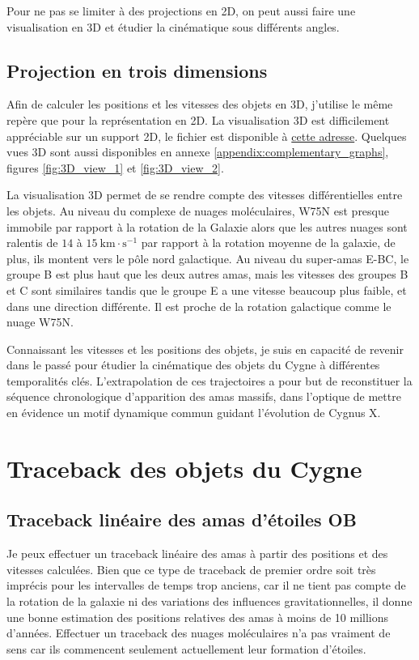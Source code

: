 \documentclass[a4paper, 11pt]{article}
\begin{document}
	Pour ne pas se limiter à des projections en 2D, on peut aussi faire une visualisation en 3D et étudier la cinématique sous différents angles.
		
	\subsection{Projection en trois dimensions}
	Afin de calculer les positions et les vitesses des objets en 3D, j'utilise le même repère que pour la représentation en 2D. La visualisation 3D est difficilement appréciable sur un support 2D, le fichier est disponible à \href{https://github.com/KyuriTaima/CygnusDynamics/blob/8276b42224d7c76e1cba126970f6e30ef20acc10/Carte_Cygnus_3D_quiver.html }{cette adresse}. Quelques vues 3D sont aussi disponibles en annexe \ref{appendix:complementary_graphs}, figures \ref{fig:3D_view_1} et \ref{fig:3D_view_2}.

	La visualisation 3D permet de se rendre compte des vitesses différentielles entre les objets. Au niveau du complexe de nuages moléculaires, W75N est presque immobile par rapport à la rotation de la Galaxie alors que les autres nuages sont ralentis de $14$ à $15 \ \mathrm{km\cdot s^{-1}}$ par rapport à la rotation moyenne de la galaxie, de plus, ils montent vers le pôle nord galactique. Au niveau du super-amas E-BC, le groupe B est plus haut que les deux autres amas, mais les vitesses des groupes B et C sont similaires tandis que le groupe E a une vitesse beaucoup plus faible, et dans une direction différente. Il est proche de la rotation galactique comme le nuage W75N.
	
	Connaissant les vitesses et les positions des objets, je suis en capacité de revenir dans le passé pour étudier la cinématique des objets du Cygne à différentes temporalités clés. L'extrapolation de ces trajectoires a pour but de reconstituer la séquence chronologique d'apparition des amas massifs, dans l'optique de mettre en évidence un motif dynamique commun guidant l'évolution de Cygnus X.
	
	\section{Traceback des objets du Cygne}
	\subsection{Traceback linéaire des amas d'étoiles OB}
	Je peux effectuer un traceback linéaire des amas à partir des positions et des vitesses calculées. Bien que ce type de traceback de premier ordre soit très imprécis pour les intervalles de temps trop anciens, car il ne tient pas compte de la rotation de la galaxie ni des variations des influences gravitationnelles, il donne une bonne estimation des positions relatives des amas à moins de 10 millions d'années. Effectuer un traceback des nuages moléculaires n'a pas vraiment de sens car ils commencent seulement actuellement leur formation d'étoiles. 
	
\end{document}
